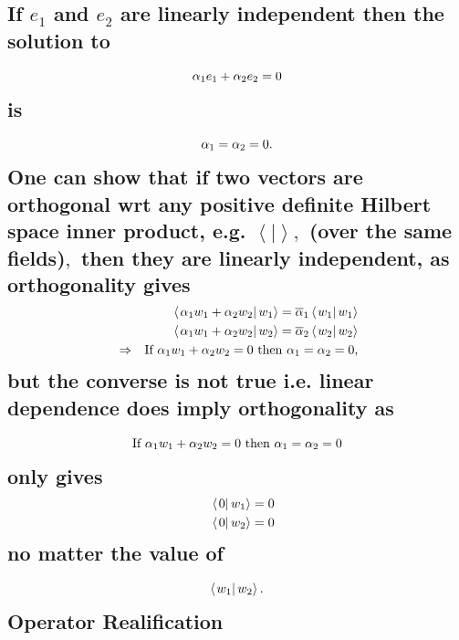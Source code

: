 \documentclass[aps,preprint]{revtex4}
\begin{document}
\subsection{If $e_{1}$ and $e_{2}$ are linearly independent then the
solution to 
\protect\begin{equation}
\protect\alpha _{1}e_{1}+\protect\alpha _{2}e_{2}=0 
\protect\end{equation}%
is 
\protect\begin{equation}
\protect\alpha _{1}=\protect\alpha _{2}=0. 
\protect\end{equation}%
One can show that if two vectors are orthogonal wrt any positive definite
Hilbert space inner product, e.g. $\left\langle \left. {}\right\vert
\right\rangle ,$ (over the same fields)$,$ then they are linearly
independent, as orthogonality gives 
\protect\begin{eqnarray}
&&\left\langle \left. \protect\alpha _{1}w_{1}+\protect\alpha %
_{2}w_{2}\right\vert w_{1}\right\rangle =\overline{\protect\alpha }%
_{1}\left\langle \left. w_{1}\right\vert w_{1}\right\rangle \\
&&\left\langle \left. \protect\alpha _{1}w_{1}+\protect\alpha %
_{2}w_{2}\right\vert w_{2}\right\rangle =\overline{\protect\alpha }%
_{2}\left\langle \left. w_{2}\right\vert w_{2}\right\rangle \\
&\Rightarrow &\text{If }\protect\alpha _{1}w_{1}+\protect\alpha _{2}w_{2}=0%
\text{ then }\protect\alpha _{1}=\protect\alpha _{2}=0, 
\protect\end{eqnarray}%
but the converse is not true i.e. linear dependence does imply orthogonality
as 
\protect\begin{equation*}
\text{If }\protect\alpha _{1}w_{1}+\protect\alpha _{2}w_{2}=0\text{ then }%
\protect\alpha _{1}=\protect\alpha _{2}=0 
\protect\end{equation*}%
only gives 
\protect\begin{eqnarray}
&&\left\langle \left. 0\right\vert w_{1}\right\rangle =0 \\
&&\left\langle \left. 0\right\vert w_{2}\right\rangle =0 
\protect\end{eqnarray}%
no matter the value of 
\protect\begin{equation}
\left\langle \left. w_{1}\right\vert w_{2}\right\rangle . 
\protect\end{equation}%
Operator Realification \label{Operator Realification}}
\end{document}
